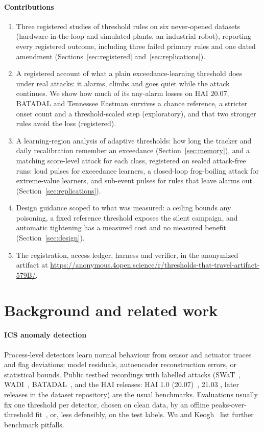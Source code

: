 \documentclass[sigconf,review,anonymous]{acmart}
\begin{document}
\paragraph{Contributions}
\begin{enumerate}
\item Three registered studies of threshold rules on six never-opened datasets (hardware-in-the-loop
  and simulated plants, an industrial robot), reporting every registered outcome, including three
  failed primary rules and one dated amendment
  (Sections~\ref{sec:registered} and~\ref{sec:replications}).
\item A registered account of what a plain exceedance-learning threshold does under real attacks: it
  alarms, climbs and goes quiet while the attack continues. We show how much of its any-alarm losses
  on HAI 20.07, BATADAL and Tennessee Eastman survives a chance reference, a stricter onset count and a
  threshold-scaled step (exploratory), and that two stronger rules avoid the loss (registered).
\item A learning-region analysis of adaptive thresholds: how long the tracker and daily
  recalibration remember an exceedance (Section~\ref{sec:memory}), and a matching score-level attack
  for each class, registered on sealed attack-free runs: loud pulses for exceedance learners, a
  closed-loop frog-boiling attack for extreme-value learners, and sub-event pulses for rules that leave
  alarms out (Section~\ref{sec:replications}).
\item Design guidance scoped to what was measured: a ceiling bounds any poisoning, a fixed reference
  threshold exposes the silent campaign, and automatic tightening has a measured cost and no measured
  benefit (Section~\ref{sec:design}).
\item The registration, access ledger, harness and verifier, in the anonymized artifact at
  \url{https://anonymous.4open.science/r/thresholds-that-travel-artifact-579B/}.
\end{enumerate}

\section{Background and related work}

\paragraph{ICS anomaly detection}
Process-level detectors learn normal behaviour from sensor and actuator traces and flag deviations:
model residuals, autoencoder reconstruction errors, or statistical bounds. Public testbed recordings
with labelled attacks (SWaT~\cite{goh2016swat}, WADI~\cite{ahmed2017wadi},
BATADAL~\cite{taormina2018batadal}, and the HAI releases: HAI 1.0 (20.07)~\cite{shin2020hai}, 21.03
\cite{shin2021hai}, later releases in the dataset repository) are the usual benchmarks. Evaluations
usually fix one threshold per detector, chosen on clean data, by an offline peaks-over-threshold
fit~\cite{su2019omni}, or, less defensibly, on the test labels. Wu and Keogh~\cite{wu2023benchmarks}
list further benchmark pitfalls.
\end{document}
